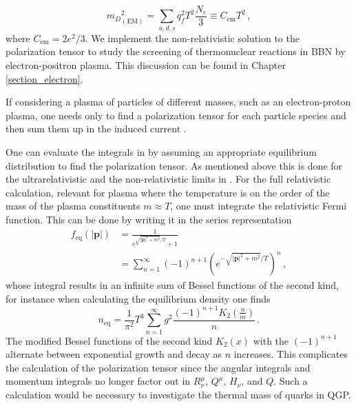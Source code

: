 \begin{equation}\label{eq:Debyem}
    {m_D}^2_{(\text{EM})} = \sum_{u,d,s} q^2_f T^2 \frac{N_c}{3} \equiv C_{\text{em}}T^2\,,
\end{equation}
where $C_{\text{em}} =  2e^2/3$. We implement the non-relativistic solution to the polarization tensor to study the screening of thermonuclear reactions in BBN by electron-positron plasma. This discussion can be found in Chapter \ref{section_electron}.

If considering a plasma of particles of different masses, such as an electron-proton plasma, one needs only to find a polarization tensor for each particle species and then sum them up in the induced current .

One can evaluate the integrals in  by assuming an appropriate equilibrium distribution to find the polarization tensor. As mentioned above this is done for the ultrarelativistic and the non-relativistic limits in \cite{Formanek:2021blc}. For the full relativistic calculation, relevant for plasma where the temperature is on the order of the mass of the plasma constituents $m\approx T$, one must integrate the relativistic Fermi function. This can be done by writing it in the series representation \cite{Letessier:2002ony}
\begin{equation}
\begin{split}
     f_\mathrm{eq}(|\pmb{p}|) &= \frac{1}{e^{\sqrt{|\boldsymbol{p}|^2+ m^2}/T} + 1} \\
     &= \sum_{n=1}^{\infty} (-1)^{n+1}\left( e^{-\sqrt{|\boldsymbol{p}|^2+ m^2}/T}\right)^n\,,
    \end{split}
\end{equation}
whose integral results in an infinite sum of Bessel functions of the second kind, for instance when calculating the equilibrium density one finds
\begin{equation}
    n_\mathrm{eq}=\frac{1}{\pi^2}T^3\sum_{n=1}^{\infty}g^2\frac{ (-1)^{n+1} K_2\left(\frac{n}{m}\right)}{ n}\,.
\end{equation}
The modified Bessel functions of the second kind $K_2(x)$ with the $(-1)^{n+1}$ alternate between exponential growth and decay as $n$ increases. This complicates the calculation of the polarization tensor since the angular integrals and momentum integrals no longer factor out in $R^\mu_\nu$, $Q^\mu$, $H_\nu$, and $Q$. Such a calculation would be necessary to investigate the thermal mass of quarks in QGP.


